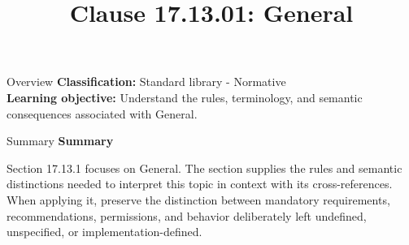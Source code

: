 \documentclass[10pt,letterpaper]{article}
\title{Clause 17.13.01: General}
\author{}
\date{}
\begin{document}
\maketitle
\begin{CornellOverviewBox}{Overview}
\textbf{Classification:} Standard library - Normative\\[2pt]
\textbf{Learning objective:} Understand the rules, terminology, and semantic consequences associated with General.
\end{CornellOverviewBox}\begin{CornellSummaryBox}{Summary}
{\sffamily\bfseries\color{Accent} Summary}\par\vspace{3pt}Section 17.13.1 focuses on General. The section supplies the rules and semantic distinctions needed to interpret this topic in context with its cross-references. When applying it, preserve the distinction between mandatory requirements, recommendations, permissions, and behavior deliberately left undefined, unspecified, or implementation-defined.
\end{CornellSummaryBox}
\end{document}
